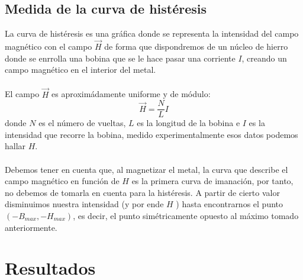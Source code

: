 \documentclass[11pt,letterpaper,twocolumn]{article}
\begin{document}
\subsection{Medida de la curva de histéresis}
La curva de histéresis es una gráfica donde se representa la intensidad del campo magnético con el campo $\vec{H}$ de forma que dispondremos de un núcleo de hierro donde se enrrolla una bobina que se le hace pasar una corriente  $I$, creando un campo magnético en el interior del metal. \\
\\
El campo $\vec{H}$ es aproximádamente uniforme y de módulo:
 \begin{equation}
	 \vec{H}=\frac{N}{L}I
\end{equation}
donde $N$ es el número de vueltas, $L$ es la longitud de la bobina e $I$ es la intensidad que recorre la bobina, medido experimentalmente esos datos podemos hallar $H$. \\
\\
Debemos tener en cuenta que, al magnetizar el metal, la curva que describe el campo magnético en función de $H$ es la primera curva de imanación, por tanto, no debemos de tomarla en cuenta para la histéresis. A partir de cierto valor disminuimos nuestra intensidad (y por ende $H$ ) hasta encontrarnos el punto $\left( -B_{max},-H_{max} \right) $, es decir, el punto simétricamente opuesto al máximo tomado anteriormente. 


\section{Resultados}%
\end{document}
